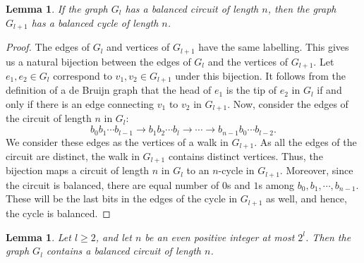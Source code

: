 \documentclass{article}
\theoremstyle{plain}
\newtheorem{lemma}[theorem]{Lemma}
\theoremstyle{definition}
\theoremstyle{remark}
\begin{document}
\begin{lemma}\label{cycle}
If the graph $G_l$ has a balanced circuit of length $n$, then the graph $G_{l+1}$ has a balanced cycle of length $n$.
\end{lemma}

\begin{proof}
The edges of $G_l$ and vertices of $G_{l+1}$ have the same labelling. This gives us a natural bijection between the edges of $G_l$ and the vertices of $G_{l+1}$. Let $e_1,e_2 \in G_l$ correspond to $v_1,v_2 \in G_{l+1}$ under this bijection. It follows from the definition of a de Bruijn graph that the head of $e_1$ is the tip of $e_2$ in $G_l$ if and only if there is an edge connecting $v_1$ to $v_2$ in $G_{l+1}$. Now, consider the edges of the circuit of length $n$ in $G_l$:
\[b_0b_1\cdots b_{l-1} \to b_1b_2\cdots b_l \to \cdots \to b_{n-1}b_0\cdots b_{l-2} . \]
We consider these edges as the vertices of a walk in $G_{l+1}$. As all the edges of the circuit are distinct, the walk in $G_{l+1}$ contains distinct vertices. Thus, the bijection maps a circuit of length $n$ in $G_l$ to an $n$-cycle in $G_{l+1}$. Moreover, since the circuit is balanced, there are equal number of $0$s and $1$s among $b_0, b_1, \cdots, b_{n-1}$. These will be the last bits in the edges of the cycle in $G_{l+1}$ as well, and hence, the cycle is balanced.
\end{proof}

\begin{lemma}\label{nin}
Let $l \geqslant 2$, and let $n$ be an even positive integer at most $2^l$. Then the graph $G_l$ contains a balanced circuit of length $n$.
\end{lemma}
\end{document}
